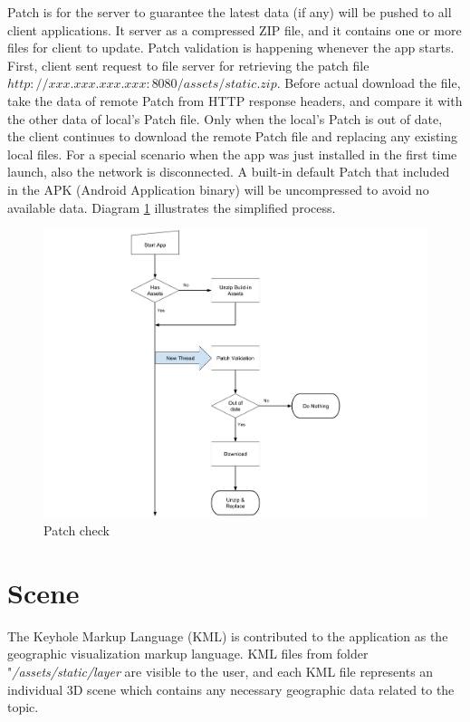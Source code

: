 Patch is for the server to guarantee the latest data (if any) will be pushed to all client applications. It server as a compressed ZIP file, and it contains one or more files for client to update. Patch validation is happening whenever the app starts. First, client sent request to file server for retrieving the patch file $http://xxx.xxx.xxx.xxx:8080/assets/static.zip$. Before actual download the file, take the  data of remote Patch from HTTP response headers, and compare it with the other  data of local's Patch file. Only when the local's Patch is out of date, the client continues to download the remote Patch file and replacing any existing local files. For a special scenario when the app was just installed in the first time launch, also the network is disconnected. A built-in default Patch that included in the APK (Android Application binary) will be uncompressed to avoid no available data. Diagram \ref{fig:patch-check} illustrates the simplified process.

\begin{figure}[H]
\caption{Patch check}
\label{fig:patch-check}
\centering
\includegraphics[width=\textwidth, keepaspectratio]{Figures/patch-check.png}
\decoRule
\end{figure}

\section{Scene}
\label{section:scene}

The Keyhole Markup Language (KML) is contributed to the application as the geographic visualization markup language. KML files from folder "\emph{/assets/static/layer} are visible to the user, and each KML file represents an individual 3D scene which contains any necessary geographic data related to the topic.

